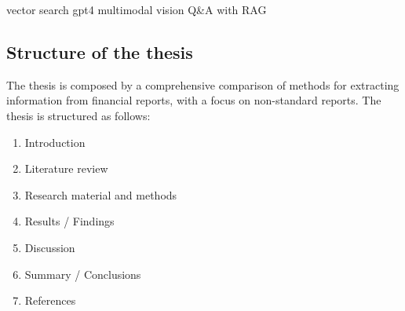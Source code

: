 \documentclass[english, 12pt, a4paper, elec, utf8, a-2b, online]{aaltothesis}
\begin{document}
vector search
gpt4 multimodal vision
Q\&A with RAG


\subsection{Structure of the thesis}

The thesis is composed by a comprehensive comparison of methods for extracting information from financial reports, with a focus on non-standard reports. The thesis is structured as follows:

\begin{enumerate}
	\item \label{list:intro} Introduction
	\item Literature review
	\item Research material and methods
	\item Results / Findings
	\item Discussion
	\item \label{list:summary} Summary / Conclusions
	\item References
\end{enumerate}
\end{document}
